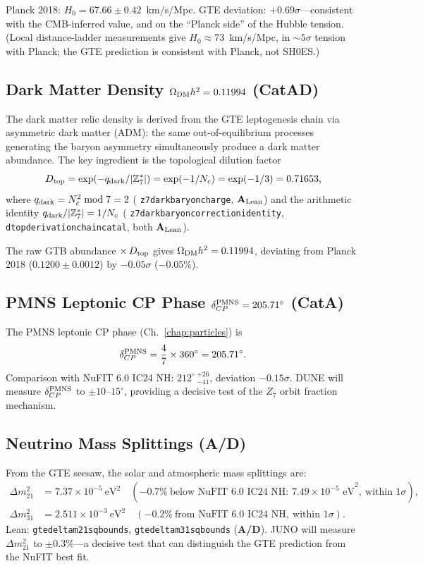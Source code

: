 \documentclass[11pt,openany]{book}
\theoremstyle{remark}
\newcommand{\ZS}{\mathbb{Z}_7}
\newcommand{\lean}[1]{%
  \penalty-100
  \begingroup\def\_{\textunderscore\allowbreak}\texttt{#1}\endgroup}
\newcommand{\Nc}{N_c}
\newcommand{\CatAL}{\ensuremath{\textbf{A}_{\rm Lean}}}
\newcommand{\CatAD}{\textbf{A/D}}
\begin{document}
Planck 2018: $H_0 = 67.66 \pm 0.42$~km/s/Mpc.
GTE deviation: $+0.69\sigma$---consistent with the CMB-inferred value, and on the
``Planck side'' of the Hubble tension.
(Local distance-ladder measurements give $H_0 \approx 73$~km/s/Mpc, in $\sim 5\sigma$
tension with Planck; the GTE prediction is consistent with Planck, not SH0ES.)

\subsection*{Dark Matter Density \texorpdfstring{$\Omega_{\rm DM}h^2 = 0.11994$}{Omega_DM h2 = 0.11994} (CatAD)}

The dark matter relic density is derived from the GTE leptogenesis chain via
asymmetric dark matter (ADM): the same out-of-equilibrium processes generating
the baryon asymmetry simultaneously produce a dark matter abundance.
The key ingredient is the topological dilution factor
\[
  D_{\rm top}
  = \exp(-q_{\rm dark}/|\ZS^*|)
  = \exp(-1/\Nc)
  = \exp(-1/3)
  = 0.71653,
\]
where $q_{\rm dark} = N_c^2 \bmod 7 = 2$ (\lean{z7\_dark\_baryon\_charge}, \CatAL)
and the arithmetic identity $q_{\rm dark}/|\ZS^*| = 1/\Nc$
(\lean{z7\_dark\_baryon\_correction\_identity}, \lean{d\_top\_derivation\_chain\_catal},
both \CatAL).

The raw GTB abundance $\times\, D_{\rm top}$ gives
$\Omega_{\rm DM}h^2 = 0.11994$,
deviating from Planck 2018 ($0.1200 \pm 0.0012$) by $-0.05\sigma$ ($-0.05\%$).

\subsection*{PMNS Leptonic CP Phase \texorpdfstring{$\delta_{CP}^{\rm PMNS} = 205.71^\circ$}{delta_CP = 205.71 deg} (CatA)}

The PMNS leptonic CP phase (Ch.~\ref{chap:particles}) is
\[
  \delta_{CP}^{\rm PMNS}
  = \frac{4}{7} \times 360^\circ
  = 205.71^\circ.
\]
Comparison with NuFIT 6.0 IC24 NH: $212^\circ\,{}^{+26}_{-41}$,
deviation $-0.15\sigma$.
DUNE will measure $\delta_{CP}^{\rm PMNS}$ to $\pm 10$--$15^\circ$,
providing a decisive test of the $Z_7$ orbit fraction mechanism.

\subsection*{Neutrino Mass Splittings (\CatAD)}

From the GTE seesaw, the solar and atmospheric mass splittings are:
\begin{align*}
  \Delta m^2_{21} &= 7.37 \times 10^{-5}~\text{eV}^2
  \quad (-0.7\%\ \text{below NuFIT 6.0 IC24 NH: $7.49 \times 10^{-5}$~eV}^2,\ \text{within $1\sigma$}),\\
  \Delta m^2_{31} &= 2.511 \times 10^{-3}~\text{eV}^2
  \quad (-0.2\%\ \text{from NuFIT 6.0 IC24 NH},\ \text{within $1\sigma$}).
\end{align*}
Lean: \lean{gte\_delta\_m21\_sq\_bounds}, \lean{gte\_delta\_m31\_sq\_bounds} (\CatAD).
JUNO will measure $\Delta m^2_{21}$ to $\pm 0.3\%$---a decisive test that can
distinguish the GTE prediction from the NuFIT best fit.
\end{document}
